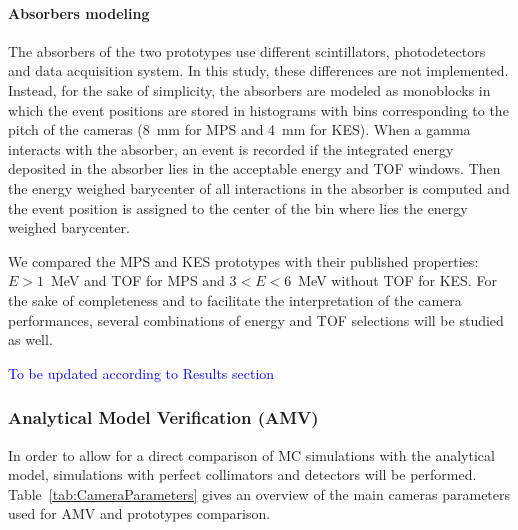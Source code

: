 \documentclass[a4paper,english,12pt]{article}
\newcommand{\et}[2][blue]{\textcolor{#1}{#2}}
\begin{document}
\paragraph{Absorbers modeling}

The absorbers of the two prototypes use different scintillators, photodetectors and data acquisition system. In this study, these differences are not implemented. Instead, for the sake of simplicity, the absorbers are modeled as monoblocks in which the event positions are stored in histograms with bins corresponding to the pitch of the cameras (8~mm for MPS and 4~mm for KES). When a gamma interacts with the absorber, an event is recorded if the integrated energy deposited in the absorber lies in the acceptable energy and TOF windows. Then the energy weighed barycenter of all interactions in the absorber is computed and the event position is assigned to the center of the bin where lies the energy weighed barycenter.

We compared the MPS and KES prototypes with their published properties: $E>1$~MeV and TOF for MPS and $3<E<6$~MeV without TOF for KES. For the sake of completeness and to facilitate the interpretation of the camera performances, several combinations of energy and TOF selections will be studied as well. 

\et{To be updated according to Results section}


\subsubsection{Analytical Model Verification (AMV)} %

In order to allow for a direct comparison of MC simulations with the analytical model, simulations with perfect collimators and detectors will be performed. Table~\ref{tab:CameraParameters} gives an overview of the main cameras parameters used for AMV and prototypes comparison.
\end{document}
